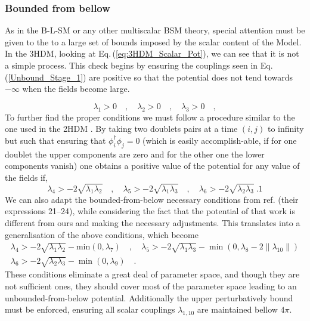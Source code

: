 \documentclass[10pt]{book}
\renewcommand{\(}{\left(}
\renewcommand{\)}{\right)}
\renewcommand{\[}{\left[}
\renewcommand{\]}{\right]}
\begin{document}
\subsubsection{Bounded from bellow}

As in the B-L-SM or any other multiscalar BSM theory, special attention must be given to the to a large set of bounds imposed by the scalar content of the Model. 
%
In the 3HDM, looking at Eq.\,(\ref{eq:3HDM_Scalar_Pot}), we can see that it is not a simple process. This check begins by ensuring the couplings seen in Eq.\,(\ref{Unbound_Stage_1}) are positive so that the potential does not tend towards $-\infty$ when the fields become large. 

\begin{equation}
\label{Unbound_Stage_1}
\lambda_1 > 0  \quad , \quad \lambda_2 > 0 \quad , \quad \lambda_3 > 0 \quad , 
\end{equation}
%
To further find the proper conditions we must follow a procedure similar to the one used in the 2HDM \cite{Branco_1996}.
%
By taking two doublets pairs at a time $(i, j)$ to infinity but such that ensuring that $\phi_i^\dagger \phi_j = 0$ (which is easily accomplish-able, if for one doublet the upper components are zero and for the other one the lower components vanish) one obtains a positive value of the potential for any value of the fields if,
%
\begin{equation}
\lambda_4 > -2 \sqrt{\lambda_1 \lambda_2} \quad , \quad \lambda_5 > -2 \sqrt{\lambda_1 \lambda_3} \quad , \quad \lambda_6 > -2 \sqrt{\lambda_2 \lambda_3} \ . 1
\end{equation}
%
We can also adapt the bounded-from-below necessary conditions from ref. \cite{Moretti_2015} (their expressions 21–24), while considering the fact that the potential of that work is different from ours and making the necessary adjustments.
%
This translates into a generalisation of the above conditions, which become
%
\begin{equation}
\begin{gathered}
\lambda_4 > - 2 \sqrt{\lambda_1 \lambda_2} - \text{min}(0,\lambda_7) \quad , \quad  \lambda_5 > -2 \sqrt{\lambda_1 \lambda_3} - \min(0,\lambda_8 - 2\|\lambda_{10}\|)  \\
\lambda_6 > - 2 \sqrt{\lambda_2 \lambda_3} - \min(0,\lambda_9) \quad . 
\end{gathered} 
\end{equation}
%
These conditions eliminate a great deal of parameter space, and though they are not sufficient ones, they should cover most of the parameter space leading to an unbounded-from-below potential.
% 
Additionally the upper perturbatively bound must be enforced, ensuring all scalar couplings $\lambda_{1,10}$ are maintained bellow $4\pi$.
\end{document}
